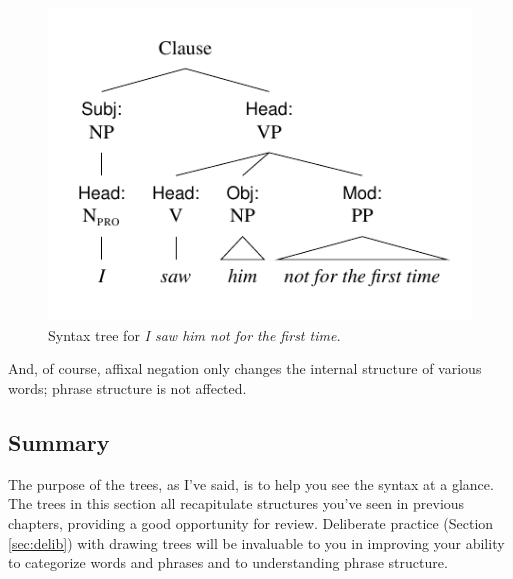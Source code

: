\begin{figure}
    \centering
    \includegraphics{figures/notforthefirsttime.pdf}
    \caption{Syntax tree for \textit{I saw him not for the first time.}}
    \label{tree:notforthefirsttime}
\end{figure}

And, of course, affixal negation only changes the internal structure of various words; phrase structure is not affected.

\subsection{Summary}

The purpose of the trees, as I've said, is to help you see the syntax at a glance. The trees in this section all recapitulate structures you've seen in previous chapters, providing a good opportunity for review. Deliberate practice (Section \ref{sec:delib}) with drawing trees will be invaluable to you in improving your ability to categorize words and phrases and to understanding phrase structure.